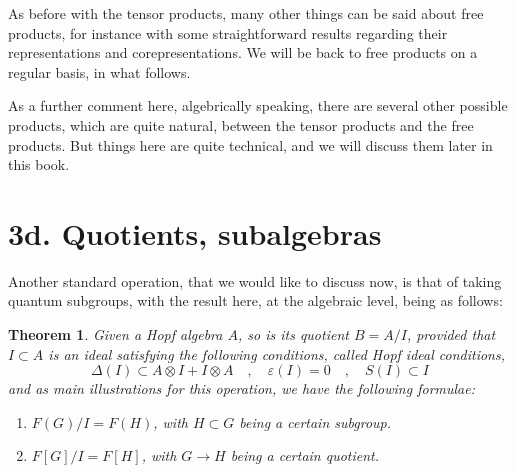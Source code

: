 \documentclass[12pt]{amsbook}
\newtheorem{theorem}{Theorem}[chapter]
\begin{document}
As before with the tensor products, many other things can be said about free products, for instance with some straightforward results regarding their representations and corepresentations. We will be back to free products on a regular basis, in what follows.

\bigskip

As a further comment here, algebrically speaking, there are several other possible products, which are quite natural, between the tensor products and the free products. But things here are quite technical, and we will discuss them later in this book.

\section*{3d. Quotients, subalgebras} 

Another standard operation, that we would like to discuss now, is that of taking quantum subgroups, with the result here, at the algebraic level, being as follows:


\begin{theorem}
Given a Hopf algebra $A$, so is its quotient $B=A/I$, provided that $I\subset A$ is an ideal satisfying the following conditions, called Hopf ideal conditions,
$$\Delta(I)\subset A\otimes I+I\otimes A\quad,\quad\varepsilon(I)=0\quad,\quad S(I)\subset I$$
and as main illustrations for this operation, we have the following formulae:
\begin{enumerate}
\item $F(G)/I=F(H)$, with $H\subset G$ being a certain subgroup.

\item $F[G]/I=F[H]$, with $G\to H$ being a certain quotient.
\end{enumerate}
\end{theorem}
\end{document}
